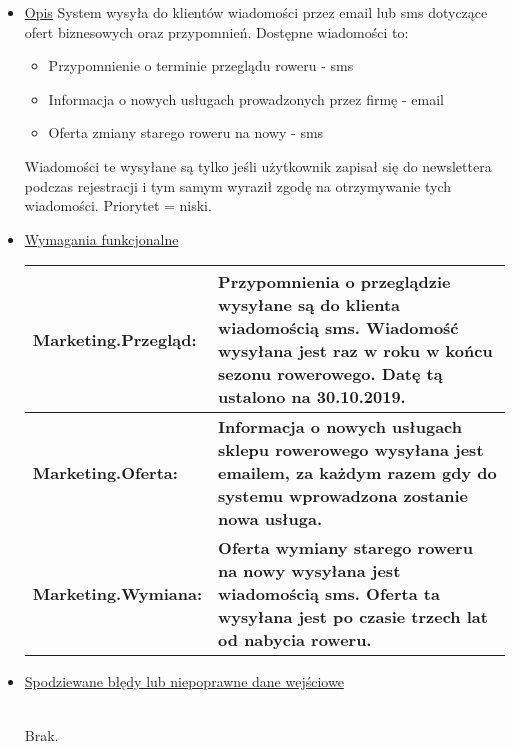 \documentclass[a4paper,20pt]{article}
\begin{document}
\begin{itemize}
\item \underline{Opis} 
\newline
\newline
System wysyła do klientów wiadomości przez email lub sms dotyczące ofert biznesowych oraz przypomnień. Dostępne wiadomości to:
\begin{itemize}
\item Przypomnienie o terminie przeglądu roweru - sms
\item Informacja o nowych usługach prowadzonych przez firmę - email
\item Oferta zmiany starego roweru na nowy - sms
\end{itemize}
Wiadomości te wysyłane są tylko jeśli użytkownik zapisał się do newslettera podczas rejestracji i tym samym wyraził zgodę na otrzymywanie tych wiadomości. Priorytet = niski.
\newline

\item \underline{Wymagania funkcjonalne}

\begin{center}
\begin{tabularx}{\textwidth}[t]{XX}

\arrayrulecolor{black}\hline
\textbf{Marketing.Przegląd:} & \textbf{Przypomnienia o przeglądzie wysyłane są do klienta wiadomością sms. Wiadomość wysyłana jest raz w roku w końcu sezonu rowerowego. Datę tą ustalono na 30.10.2019.} \\

\hline


\arrayrulecolor{black}\hline
\textbf{Marketing.Oferta:} & \textbf{Informacja o nowych usługach sklepu rowerowego wysyłana jest emailem, za każdym razem gdy do systemu wprowadzona zostanie nowa usługa.} \\

\hline


\arrayrulecolor{black}\hline
\textbf{Marketing.Wymiana:} & \textbf{Oferta wymiany starego roweru na nowy wysyłana jest wiadomością sms. Oferta ta wysyłana jest po czasie trzech lat od nabycia roweru.} \\

\hline


\end{tabularx}
\end{center}


\item \underline{Spodziewane błędy lub niepoprawne dane wejściowe}

\mbox{}\\
Brak.

\end{itemize}
\end{document}
